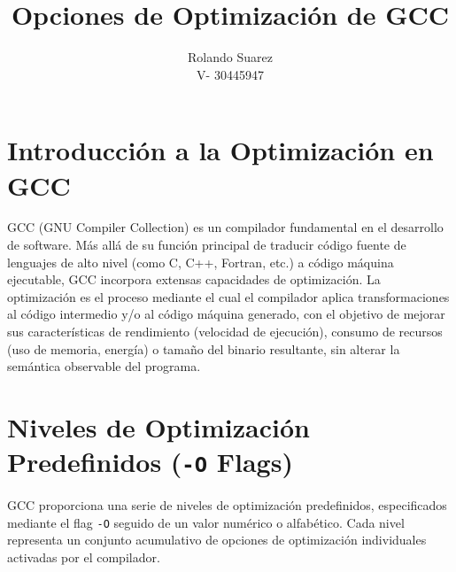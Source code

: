 \documentclass{article}
\title{Opciones de Optimización de GCC}
\author{Rolando Suarez\\
		V- 30445947}
\date{}
\begin{document}
	
	\maketitle
	
	\section{Introducción a la Optimización en GCC}
	GCC (GNU Compiler Collection) es un compilador fundamental en el desarrollo de software. Más allá de su función principal de traducir código fuente de lenguajes de alto nivel (como C, C++, Fortran, etc.) a código máquina ejecutable, GCC incorpora extensas capacidades de optimización. La optimización es el proceso mediante el cual el compilador aplica transformaciones al código intermedio y/o al código máquina generado, con el objetivo de mejorar sus características de rendimiento (velocidad de ejecución), consumo de recursos (uso de memoria, energía) o tamaño del binario resultante, sin alterar la semántica observable del programa.
	
	\section{Niveles de Optimización Predefinidos (\texttt{-O} Flags)}
	GCC proporciona una serie de niveles de optimización predefinidos, especificados mediante el flag \texttt{-O} seguido de un valor numérico o alfabético. Cada nivel representa un conjunto acumulativo de opciones de optimización individuales activadas por el compilador.
	
\end{document}

